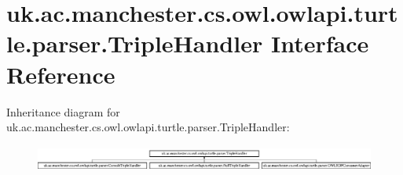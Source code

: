\hypertarget{interfaceuk_1_1ac_1_1manchester_1_1cs_1_1owl_1_1owlapi_1_1turtle_1_1parser_1_1_triple_handler}{\section{uk.\-ac.\-manchester.\-cs.\-owl.\-owlapi.\-turtle.\-parser.\-Triple\-Handler Interface Reference}
\label{interfaceuk_1_1ac_1_1manchester_1_1cs_1_1owl_1_1owlapi_1_1turtle_1_1parser_1_1_triple_handler}
}
Inheritance diagram for uk.\-ac.\-manchester.\-cs.\-owl.\-owlapi.\-turtle.\-parser.\-Triple\-Handler\-:\begin{figure}[H]
\begin{center}
\leavevmode
\includegraphics[height=0.864197cm]{interfaceuk_1_1ac_1_1manchester_1_1cs_1_1owl_1_1owlapi_1_1turtle_1_1parser_1_1_triple_handler}
\end{center}
\end{figure}
